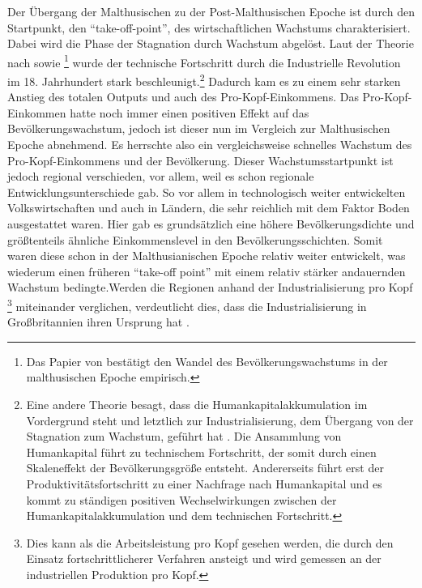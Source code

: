 Der {\"U}bergang der Malthusischen zu der Post-Malthusischen Epoche ist durch den Startpunkt, den "`take-off-point"', des wirtschaftlichen Wachstums charakterisiert. Dabei wird die Phase der Stagnation durch Wachstum abgel{\"o}st. 
Laut der Theorie nach \citet{Hansen.2002} sowie \citet{Ashraf.2008}\footnote{Das Papier von \citet{Ashraf.2008} bestätigt den Wandel des Bevölkerungswachstums in der malthusischen Epoche empirisch.} wurde der technische Fortschritt  durch die Industrielle Revolution im 18. Jahrhundert stark beschleunigt.\footnote{Eine andere Theorie besagt, dass die Humankapitalakkumulation im Vordergrund steht und letztlich zur Industrialisierung, dem Übergang von der Stagnation zum Wachstum, geführt hat \citep{Galor.2000}. Die Ansammlung von Humankapital führt zu technischem Fortschritt, der somit durch einen Skaleneffekt der Bevölkerungsgrö{\ss}e entsteht. Andererseits führt erst der Produktivitätsfortschritt zu einer Nachfrage nach Humankapital und es kommt zu ständigen positiven Wechselwirkungen zwischen der Humankapitalakkumulation und dem technischen Fortschritt.} Dadurch kam es zu einem sehr starken Anstieg des totalen Outputs und auch des Pro-Kopf-Einkommens. Das Pro-Kopf-Einkommen hatte noch immer einen positiven Effekt auf das Bev{\"o}lkerungswachstum, jedoch ist dieser nun im Vergleich zur Malthusischen Epoche  abnehmend. Es herrschte also ein vergleichsweise schnelles Wachstum des Pro-Kopf-Einkommens und der Bev{\"o}lkerung. \newline Dieser Wachstumsstartpunkt ist jedoch regional verschieden, vor allem, weil es schon regionale Entwicklungsunterschiede gab. So vor allem in technologisch weiter entwickelten Volkswirtschaften und auch in L{\"a}ndern, die sehr reichlich mit dem Faktor Boden ausgestattet waren. Hier gab es grunds{\"a}tzlich eine h{\"o}here Bev{\"o}lkerungsdichte und gr{\"o}{\ss}tenteils {\"a}hnliche Einkommenslevel in den Bev{\"o}lkerungsschichten. Somit waren diese schon in der Malthusianischen Epoche relativ weiter entwickelt, was wiederum einen fr{\"u}heren "`take-off point"' mit einem relativ st{\"a}rker andauernden Wachstum bedingte.\newline Werden die Regionen anhand der Industrialisierung pro Kopf \footnote{Dies kann als die Arbeitsleistung pro Kopf gesehen werden, die durch den Einsatz fortschrittlicherer Verfahren ansteigt und wird gemessen an der industriellen Produktion pro Kopf.} miteinander verglichen, verdeutlicht dies, dass die Industrialisierung in Gro{\ss}britannien ihren Ursprung hat \citep{Galor.2014}.\\


